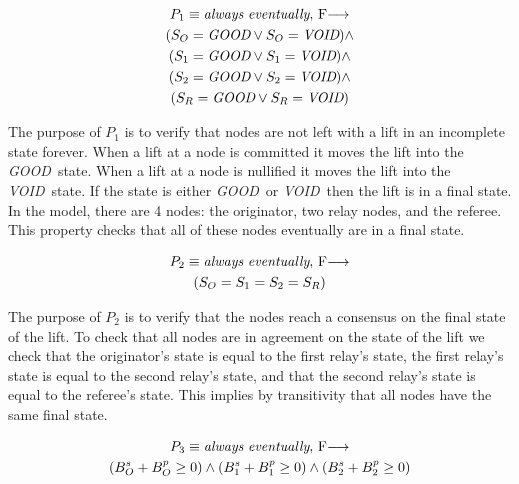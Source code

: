 \documentclass[runningheads]{llncs}
\newcommand{\originatorstate}{S_O}
\newcommand{\relayastate}{S_1}
\newcommand{\relaybstate}{S_2}
\newcommand{\refstate}{S_R}
\newcommand{\originatorsuccbal}{B^s_O}
\newcommand{\relayasuccbal}{B^s_1}
\newcommand{\relaybsuccbal}{B^s_2}
\newcommand{\originatorpredbal}{B^p_O}
\newcommand{\relayapredbal}{B^p_1}
\newcommand{\relaybpredbal}{B^p_2}
\newcommand{\void}{\emph{VOID}}
\newcommand{\good}{\emph{GOOD}}
\newcommand{\always}{\emph{always}}
\newcommand{\eventually}{\emph{eventually}}
\newcommand{\fair}{$F$}
\begin{document}
\begin{definition}[Property 1]
\begin{multline*}
    P_1 \equiv \always\ \eventually,\ \fair \longrightarrow \\
    (\originatorstate = \good \vee \originatorstate = \void) \wedge \\
     (\relayastate = \good \vee \relayastate = \void) \wedge \\
     (\relaybstate = \good \vee \relaybstate = \void) \wedge \\
     (\refstate = \good \vee \refstate = \void) \\
\end{multline*}
\end{definition}
The purpose of $P_1$ is to verify that nodes are not left with a lift in an incomplete state forever. 
When a lift at a node is committed it moves the lift into the \good\ state. When a lift at a node is nullified it moves the lift into the \void\ state. If the state is either \good\ or \void\ then the lift is in a final state. In the model, there are 4 nodes: the originator, two relay nodes, and the referee. This property checks that all of these nodes eventually are in a final state. 

\begin{definition}[Property 2]
    
\begin{multline*}
P_2 \equiv \always\ \eventually,\ \fair \longrightarrow \\
    (\originatorstate = \relayastate = \relaybstate = \refstate) \\
\end{multline*}
\end{definition}
The purpose of $P_2$ is to verify that the nodes reach a consensus on the final state of the lift. To check that all nodes are in agreement on the state of the lift we check that the originator's state is equal to the first relay's state, the first relay's state is equal to the second relay's state, and that the second relay's state is equal to the referee's state. This implies by transitivity that all nodes have the same final state. 

\begin{definition}[Property 3]
\begin{multline*}
P_3 \equiv \always\ \eventually,\ \fair \longrightarrow \\
    (\originatorsuccbal + \originatorpredbal \ge 0) \wedge
    (\relayasuccbal + \relayapredbal \ge 0) \wedge
    (\relaybsuccbal + \relaybpredbal \ge 0) \\
\end{multline*}
\end{definition}
\end{document}
